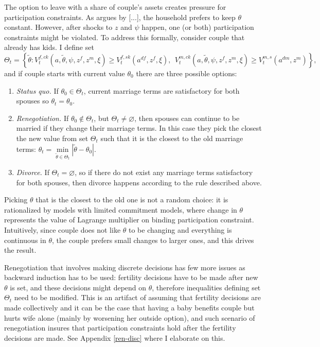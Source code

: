 \documentclass[12pt,letter]{article}
\begin{document}
The option to leave with a share of couple's assets creates pressure for participation constraints. As argues by [...], the household prefers to keep $\theta$ constant. However, after shocks to $z$ and $\psi$ happen, one (or both) participation constraints might be violated. To address this formally, consider couple that already has kids. I define set
\begin{equation}\Theta_t = \left\{ \tilde\theta : V^{f,ck}_t(a,\tilde\theta,\psi,z^f,z^m,\xi) \geq V_t^{f,sk}(a^{df},z^f,\xi) , \ \ V_t^{m,ck}(a,\tilde\theta,\psi,z^f,z^m,\xi)\geq V_t^{m,s}(a^{dm},z^m) \right\} \label{reneg-with-kids}
,\end{equation}
and if couple starts with current value $\theta_{0}$ there are three possible options:
\begin{enumerate}
\item \textit{Status quo.} If $\theta_0 \in \Theta_t$, current marriage terms are satisfactory for both spouses so $\theta_t = \theta_{0}$.
\item \textit{Renegotiation.} If $\theta_0 \not\in \Theta_t$, but $\Theta_t \neq \varnothing$, then spouses can continue to be married if they change their marriage terms. In this case they pick the closest the new value from set $\Theta_t$ such that it is the closest to the old marriage terms: $\theta_t = \min\limits_{\tilde\theta\in\Theta_t} |\tilde\theta - \theta_0|$. 
\item \textit{Divorce.}  If $\Theta_t = \varnothing$, so if there do not exist any marriage terms satisfactory for both spouses, then divorce happens according to the rule described above.
\end{enumerate}
Picking $\theta$ that is the closest to the old one is not a random choice: it is rationalized by models with limited commitment models, where change in $\theta$ represents the value of Lagrange multiplier on binding participation constraint. Intuitively, since couple does not like $\theta$ to be changing and everything is continuous in $\theta$, the couple prefers small changes to larger ones, and this drives the result.

Renegotiation that involves making discrete decisions has few more issues as backward induction has to be used: fertility decisions have to be made after new $\theta$ is set, and these decisions might depend on $\theta$, therefore inequalities defining set $\Theta_t$ need to be modified. This is an artifact of assuming that fertility decisions are made collectively and it can be the case that having a baby benefits couple but hurts wife alone (mainly by worsening her outside option), and such scenario of renegotiation insures that participation constraints hold after the fertility decisions are made. See Appendix \ref{ren-disc} where I elaborate on this.
\end{document}
